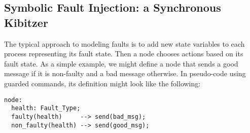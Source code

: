 \documentclass{llncs/llncs}
\newcommand{\lee}[1]{ } %
\newcommand{\lee}[1]{ {\color{blue}$<$lee: #1$>$} } %
\begin{document}



\subsection{Symbolic Fault Injection: a Synchronous Kibitzer}\label{sec:kibitzer}
The typical approach to modeling faults is to add new state variables to each process representing its fault state. Then a node chooses actions based on its fault state. As a simple example, we might define a node that sends a good message if it is non-faulty and a bad message otherwise. In pseudo-code using guarded commands, its definition might look like the following:

\small
\begin{verbatim}
node:
  health: Fault_Type;
  faulty(health)     --> send(bad_msg);
  non_faulty(health) --> send(good_msg);
\end{verbatim}
\normalsize

\end{document}
